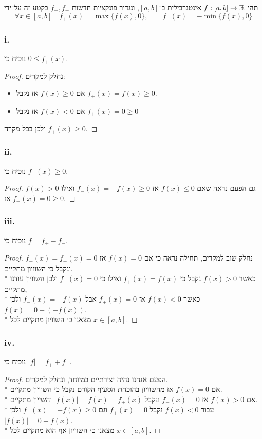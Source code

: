 \Question{}
תהי $f : [a, b] \to \mathbb{R}$ אינטגרבילית ב־$[a, b]$, ונגדיר פונקציות חדשות $f_-, f_+$ בקטע זה על־ידי
\[
	\forall x \in [a, b]
	\quad
	f_+(x) = \max\{f(x), 0\},
	\qquad
	f_-(x) = -\min\{f(x), 0\}
\]

\Subquestion{}
\subsubsection{i.}
נוכיח כי $0 \le f_+(x)$.
\begin{proof}
	נחלק למקרים:
	\begin{itemize}
		\item אם $f(x) \ge 0$ אז נקבל $f_+(x) = f(x) \ge 0$.
		\item אם $f(x) < 0$ אז נקבל $f_+(x) = 0 \ge 0$
	\end{itemize}
	ולכן בכל מקרה $f_+(x) \ge 0$.
\end{proof}

\subsubsection{ii.}
נוכיח כי $f_-(x) \ge 0$.
\begin{proof}
	גם הפעם נראה שאם $f(x) \le 0$ אז $f_-(x) = -f(x) \ge 0$ ואילו $f(x) > 0$ אז $f_-(x) = 0 \ge 0$.
\end{proof}

\subsubsection{iii.}
נוכיח כי $f = f_+ - f_-$.
\begin{proof}
	נחלק שוב למקרים, תחילה נראה כי אם $f(x) = 0$ אז $f_+(x) = f_-(x) = 0$ ונקבל כי השוויון מתקיים. \\*
	כאשר $f(x) > 0$ נקבל כי $f_+(x) = f(x)$ ואילו כי $f_-(x) = 0$ ולכן השוויון עודנו מתקיים, \\*
	כאשר $f(x) < 0$ אז $f_+(x) = 0$ אבל $f_-(x) = -f(x)$ ולכן $f(x) = 0 - (-f(x))$. \\*
	מצאנו כי השוויון מתקיים לכל $x \in [a, b]$.
\end{proof}

\subsubsection{iv.}
נוכיח כי $|f| = f_+ + f_-$.
\begin{proof}
	הפעם אנחנו נהיה יצירתיים במיוחד, ונחלק למקרים. \\*
	אם $f(x) = 0$ אז מהשוויון בהוכחת הסעיף הקודם נקבל כי השוויון מתקיים. \\*
	אם $f(x) > 0$ אז $f_-(x) = 0$ ונקבל $|f(x)| = f(x) = f_+(x)$ והשייון מתקיים. \\*
	עבור $f(x) < 0$ נקבל $f_+(x) = 0$ וגם $f_-(x) = -f(x) \ge 0$ ולכן $|f(x)| = 0 - f(x)$. \\*
	מצאנו כי השוויון אף הוא מתקיים לכל $x \in [a, b]$.
\end{proof}


